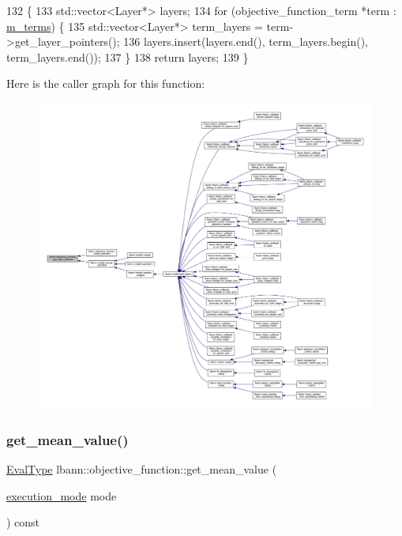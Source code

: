 \begin{DoxyCode}
132                                                                \{
133   std::vector<Layer*> layers;
134   \textcolor{keywordflow}{for} (objective\_function\_term *term : \hyperlink{classlbann_1_1objective__function_aea9c1f90ba9af1b1330efa2ba6adb5e2}{m\_terms}) \{
135     std::vector<Layer*> term\_layers = term->get\_layer\_pointers();
136     layers.insert(layers.end(), term\_layers.begin(), term\_layers.end());
137   \}
138   \textcolor{keywordflow}{return} layers;
139 \}
\end{DoxyCode}
Here is the caller graph for this function\+:\nopagebreak
\begin{figure}[H]
\begin{center}
\leavevmode
\includegraphics[width=350pt]{classlbann_1_1objective__function_a1055da2236a7faf79c5a2632f8dfc683_icgraph}
\end{center}
\end{figure}
\mbox{\label{classlbann_1_1objective__function_a0aa271e497363e97ba3741292961d47d}} 
\subsubsection{\texorpdfstring{get\+\_\+mean\+\_\+value()}{get\_mean\_value()}}
{\footnotesize\ttfamily \hyperlink{base_8hpp_a3266f5ac18504bbadea983c109566867}{Eval\+Type} lbann\+::objective\+\_\+function\+::get\+\_\+mean\+\_\+value (\begin{DoxyParamCaption}\item[{\hyperlink{base_8hpp_a2781a159088df64ed7d47cc91c4dc0a8}{execution\+\_\+mode}}]{mode }\end{DoxyParamCaption}) const}

